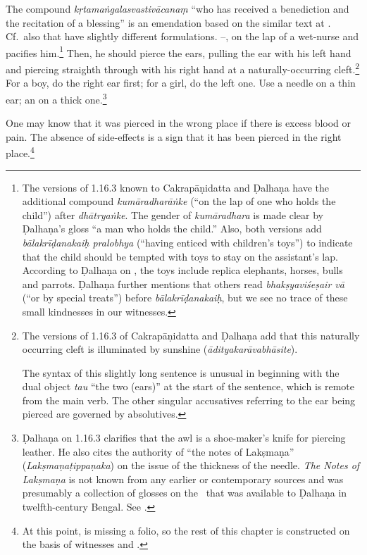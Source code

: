 \begin{translation}
{The compound \emph{kṛtamaṅgalasvastivācanaṃ} “who has received a benediction and
the recitation of a blessing” is an emendation based on the similar text at
.  Cf.\ also  that have slightly
different formulations.} --, on the lap of a wet-nurse and pacifies
him.\footnote{The versions of 1.16.3 known to Cakrapāṇidatta
    \citep[126]{acar-1939} and Ḍalhaṇa \citep[76]{vulgate} have the additional
    compound \emph{kumāradharāṅke} (“on the lap of one who holds the child”) after
    \emph{dhātryaṅke}. The gender of \emph{kumāradhara} is made clear by  Ḍalhaṇa's
    gloss “a man who holds the child.” Also, both versions add \emph{bālakrīḍanakaiḥ
    pralobhya} (“having enticed with children's toys”) to indicate that the child
    should be tempted with toys to stay on the assistant's lap. According to Ḍalhaṇa
    on , the toys include replica elephants, horses, bulls and parrots.
    Ḍalhaṇa further mentions that others read \emph{bhakṣyaviśeṣair vā} (“or by
    special treats”) before \emph{bālakrīḍanakaiḥ}, but we see no trace of these small
    kindnesses in our witnesses.} Then, he should pierce the ears, pulling the ear
    with his left hand  and piercing straighth through with his right hand at a
    naturally-occurring cleft.\footnote{The versions of 1.16.3 of Cakrapāṇidatta
        \citep[126]{acar-1939} and Ḍalhaṇa \citep[76]{vulgate} add that this naturally
        occurring cleft is illuminated by sunshine  (\emph{ādityakarāvabhāsite}).

The syntax of this slightly long sentence is unusual in beginning with the dual
object \emph{tau} “the two (ears)” at the start of the sentence, which is remote
from the main verb.  The other singular accusatives referring to the ear being
pierced are governed by absolutives.} For a boy, do the right ear first; for a
girl, do the left one. Use a needle on a thin ear; an  on a thick
one.\footnote{Ḍalhaṇa on 1.16.3 \citep[76]{vulgate} clarifies that the awl is a
    shoe-maker's knife for piercing leather.    He also cites the authority of “the
    notes of Lakṣmaṇa” (\emph{Lakṣmaṇaṭippaṇaka}) on the issue of the thickness of the
    needle. \textit{The Notes of Lakṣmaṇa} is not known from any earlier or
    contemporary sources and was presumably a collection of glosses on the \SS\ that
    was available to Ḍalhaṇa in twelfth-century Bengal. See \citet[IA,
    386]{meul-hist}.}
    
    \item [3]  One may know that it was pierced in the wrong place if there is
excess blood or pain. The absence of side-effects is a sign that it has been
pierced in the right place.\footnote{At this point, 
    is missing a folio, so the rest of this chapter is constructed on the basis of
    witnesses  and .}
    

\end{translation}
